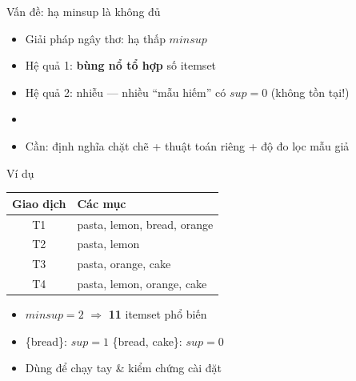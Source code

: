 \documentclass[aspectratio=169,11pt]{beamer}
\begin{document}
\begin{frame}{Vấn đề: hạ minsup là không đủ}
\begin{itemize}\itemsep0.7em
  \item Giải pháp ngây thơ: hạ thấp $minsup$
  \item Hệ quả 1: \textbf{bùng nổ tổ hợp} số itemset
  \item Hệ quả 2: nhiễu --- nhiều ``mẫu hiếm'' có $sup = 0$ (không tồn tại!)
  \item[]
  \item Cần: định nghĩa chặt chẽ + thuật toán riêng + độ đo lọc mẫu giả
\end{itemize}
\end{frame}

\begin{frame}{Ví dụ}
\centering
\begin{tabular}{cl}
\toprule
\textbf{Giao dịch} & \textbf{Các mục} \\
\midrule
T1 & pasta, lemon, bread, orange \\
T2 & pasta, lemon \\
T3 & pasta, orange, cake \\
T4 & pasta, lemon, orange, cake \\
\bottomrule
\end{tabular}
\vspace{1em}
\begin{itemize}
  \item $minsup = 2$ $\Rightarrow$ \textbf{11} itemset phổ biến
  \item \{bread\}: $sup = 1$ \quad\textbullet\quad \{bread, cake\}: $sup = 0$
  \item Dùng để chạy tay \& kiểm chứng cài đặt
\end{itemize}
\end{frame}
\end{document}
